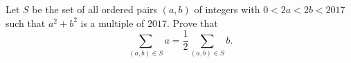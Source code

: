 Let $S$ be the set of all ordered pairs $(a,b)$ of integers with $0<2a<2b<2017$ such that $a^2+b^2$ is a multiple of $2017$. Prove that \[\sum_{(a,b)\in S}a=\frac{1}{2}\sum_{(a,b)\in S}b.\]